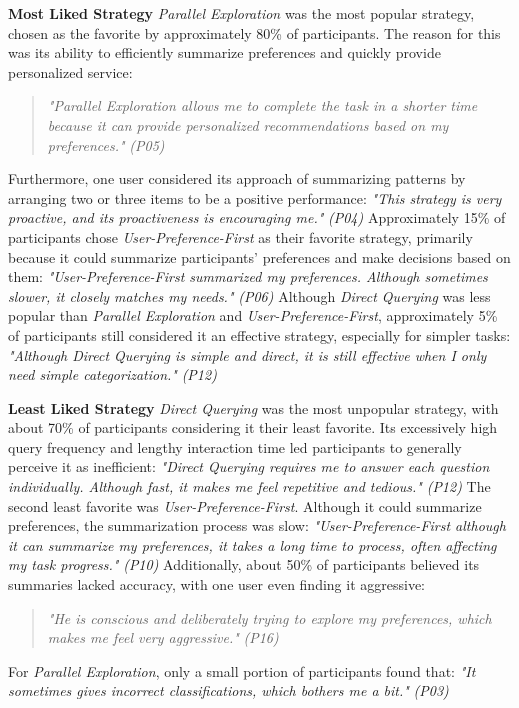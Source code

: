 \documentclass[sigconf,authordraft]{acmart}
\newcommand{\smallitalic}[1]{{\small\textit{#1}}}
\newcommand{\strategy}[1]{{\textit{#1}}}
\begin{document}
\textbf{Most Liked Strategy}
\strategy{Parallel Exploration} was the most popular strategy, chosen as the favorite by approximately 80\% of participants. The reason for this was its ability to efficiently summarize preferences and quickly provide personalized service:
\begin{quote}
\smallitalic{"Parallel Exploration allows me to complete the task in a shorter time because it can provide personalized recommendations based on my preferences."} \smallitalic{(P05)}
\end{quote}
Furthermore, one user considered its approach of summarizing patterns by arranging two or three items to be a positive performance: \smallitalic{"This strategy is very proactive, and its proactiveness is encouraging me."} \smallitalic{(P04)}
Approximately 15\% of participants chose \strategy{User-Preference-First} as their favorite strategy, primarily because it could summarize participants' preferences and make decisions based on them: \smallitalic{"User-Preference-First summarized my preferences. Although sometimes slower, it closely matches my needs."} \smallitalic{(P06)}
Although \strategy{Direct Querying} was less popular than \strategy{Parallel Exploration} and \strategy{User-Preference-First}, approximately 5\% of participants still considered it an effective strategy, especially for simpler tasks: \smallitalic{"Although Direct Querying is simple and direct, it is still effective when I only need simple categorization."} \smallitalic{(P12)}

\textbf{Least Liked Strategy}
\strategy{Direct Querying} was the most unpopular strategy, with about 70\% of participants considering it their least favorite. Its excessively high query frequency and lengthy interaction time led participants to generally perceive it as inefficient: \smallitalic{"Direct Querying requires me to answer each question individually. Although fast, it makes me feel repetitive and tedious."} \smallitalic{(P12)} The second least favorite was \strategy{User-Preference-First}. Although it could summarize preferences, the summarization process was slow: \smallitalic{"User-Preference-First although it can summarize my preferences, it takes a long time to process, often affecting my task progress."} \smallitalic{(P10)} Additionally, about 50\% of participants believed its summaries lacked accuracy, with one user even finding it aggressive: 
\begin{quote}
\smallitalic{"He is conscious and deliberately trying to explore my preferences, which makes me feel very aggressive."} \smallitalic{(P16)}
\end{quote}
For \strategy{Parallel Exploration}, only a small portion of participants found that: \smallitalic{"It sometimes gives incorrect classifications, which bothers me a bit."} \smallitalic{(P03)}
\end{document}
